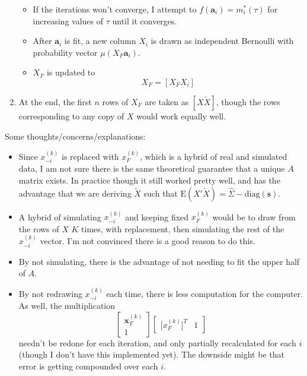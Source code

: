 \documentclass[11pt]{article}
\newcommand{\E}{\mathrm{E}}
\newcommand{\diag}{\mathrm{diag}}
\theoremstyle{definition}
\begin{document}
\begin{enumerate}
\begin{itemize}
                    \item If the iterations won't converge, I attempt to $f(\mathbf a_i)=m_i^*(\tau)$ for increasing values of $\tau$ until it converges.
                    \item After $\mathbf a_i$ is fit, a new column $X_i$ is drawn as independent Bernoulli with probability vector $\mu(X_F \mathbf a_i)$.   
                    \item $X_F$ is updated to 
                    \[ X_F = [X_F X_i] \]
                \end{itemize}
            \item At the end, the first $n$ rows of $X_F$ are taken as $[X \tilde X]$, though the rows corresponding to any copy of $X$ would work equally well.
        \end{enumerate}
        Some thoughts/concerns/explanations:
        \begin{itemize}
            \item Since $x_{-i}^{(k)}$ is replaced with $x_F^{(k)}$, which is a hybrid of real and simulated data, I am not sure there is the same theoretical guarantee that a unique $A$ matrix exists. In practice though it still worked pretty well, and has the advantage that we are deriving $\tilde X$ such that $\E(X'\tilde X) = \hat \Sigma- \diag(\mathbf s)$.
            \item A hybrid of simulating $x_{-i}^{(k)}$ and keeping fixed $x_F^{(k)}$ would be to draw from the rows of $X$ $K$ times, with replacement, then simulating the rest of the $x_{-i}^{(k)}$ vector. I'm not convinced there is a good reason to do this. 
            \item By not simulating, there is the advantage of not needing to fit the upper half of $A$.
            \item By not redrawing $x_{-i}^{(k)}$ each time, there is less computation for the computer. As well, the multiplication
                \[ \left[\begin{array}{c} \mathbf x_F^{(k)} \\ 1 \end{array}\right]\left[\begin{array}{cc} \mathbf [x_F^{(k)}]^T & 1 \end{array}\right] \]
            needn't be redone for each iteration, and only partially recalculated for each $i$ (though I don't have this implemented yet). The downside might be that error is getting compounded over each $i$.
        \end{itemize}
\end{document}
